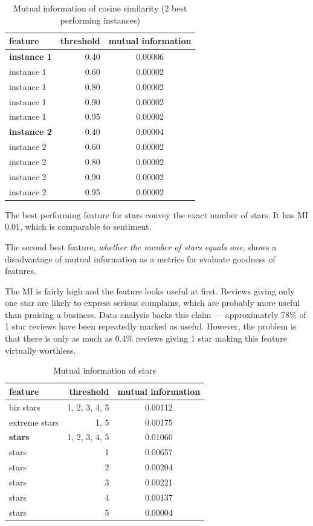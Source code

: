 \begin{table}[h!]
\centering
\begin{tabular}{lrS[table-format=3.2]}
\toprule
\textbf{feature} & \textbf{threshold} & \textbf{mutual information} \\
\midrule
\textbf{instance 1} & 0.40 & 0.00006 \\
instance 1 & 0.60 & 0.00002 \\
instance 1 & 0.80 & 0.00002 \\
instance 1 & 0.90 & 0.00002 \\
instance 1 & 0.95 & 0.00002 \\
\midrule
\textbf{instance 2} & 0.40 & 0.00004 \\
instance 2 & 0.60 & 0.00002 \\
instance 2 & 0.80 & 0.00002 \\
instance 2 & 0.90 & 0.00002 \\
instance 2 & 0.95 & 0.00002 \\
\bottomrule
\end{tabular}
\caption{Mutual information of cosine similarity (2 best performing instances)}\label{tab:mi_cossim}
\end{table}

The best performing feature for stars convey the exact number of stars.
It has MI 0.01, which is comparable to sentiment.

The second best feature, \textit{whether the number of stars equals one}, shows a disadvantage of mutual information as a metrics for evaluate goodness of features.

The MI is fairly high and the feature looks useful at first.
Reviews giving only one star are likely to express serious complains, which are probably more useful than praising a business.
Data analysis backs this claim --- approximately 78\% of 1 star reviews have been repeatedly marked as useful.
However, the problem is that there is only as much as 0.4\% reviews giving 1 star making this
feature virtually worthless.

\begin{table}[h!]
\centering
\begin{tabular}{lrS[table-format=3.2]}
\toprule
\textbf{feature} & \textbf{threshold} & \textbf{mutual information} \\
\midrule
biz stars & 1, 2, 3, 4, 5 & 0.00112 \\
extreme stars & 1, 5 & 0.00175 \\
\textbf{stars} & 1, 2, 3, 4, 5& 0.01060 \\
stars & 1 & 0.00657 \\
stars & 2 & 0.00204 \\
stars & 3 & 0.00221 \\
stars & 4 & 0.00137 \\
stars & 5 & 0.00004 \\
\bottomrule
\end{tabular}

\caption{Mutual information of stars}\label{tab:mi_stars}
\end{table}


